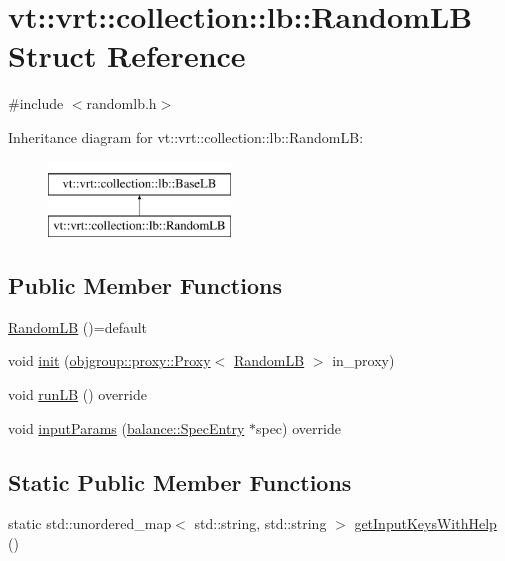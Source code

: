 \hypertarget{structvt_1_1vrt_1_1collection_1_1lb_1_1_random_l_b}{}\section{vt\+:\+:vrt\+:\+:collection\+:\+:lb\+:\+:Random\+LB Struct Reference}
\label{structvt_1_1vrt_1_1collection_1_1lb_1_1_random_l_b}


{\ttfamily \#include $<$randomlb.\+h$>$}

Inheritance diagram for vt\+:\+:vrt\+:\+:collection\+:\+:lb\+:\+:Random\+LB\+:\begin{figure}[H]
\begin{center}
\leavevmode
\includegraphics[height=2.000000cm]{structvt_1_1vrt_1_1collection_1_1lb_1_1_random_l_b}
\end{center}
\end{figure}
\subsection*{Public Member Functions}
\begin{DoxyCompactItemize}
\item 
\hyperlink{structvt_1_1vrt_1_1collection_1_1lb_1_1_random_l_b_ac6bf4ed6fb55fb787478c5f00d68f20c}{Random\+LB} ()=default
\item 
void \hyperlink{structvt_1_1vrt_1_1collection_1_1lb_1_1_random_l_b_a1b9a24043e9a971fc3acb47233028ca8}{init} (\hyperlink{structvt_1_1objgroup_1_1proxy_1_1_proxy}{objgroup\+::proxy\+::\+Proxy}$<$ \hyperlink{structvt_1_1vrt_1_1collection_1_1lb_1_1_random_l_b}{Random\+LB} $>$ in\+\_\+proxy)
\item 
void \hyperlink{structvt_1_1vrt_1_1collection_1_1lb_1_1_random_l_b_a7354965590d0ab010841a2a9086ce7e8}{run\+LB} () override
\item 
void \hyperlink{structvt_1_1vrt_1_1collection_1_1lb_1_1_random_l_b_ae0269a00daa9a3111742d9ea35f5a542}{input\+Params} (\hyperlink{structvt_1_1vrt_1_1collection_1_1balance_1_1_spec_entry}{balance\+::\+Spec\+Entry} $\ast$spec) override
\end{DoxyCompactItemize}
\subsection*{Static Public Member Functions}
\begin{DoxyCompactItemize}
\item 
static std\+::unordered\+\_\+map$<$ std\+::string, std\+::string $>$ \hyperlink{structvt_1_1vrt_1_1collection_1_1lb_1_1_random_l_b_a82f4963022fe65edd8dcd30e53525e07}{get\+Input\+Keys\+With\+Help} ()
\end{DoxyCompactItemize}
